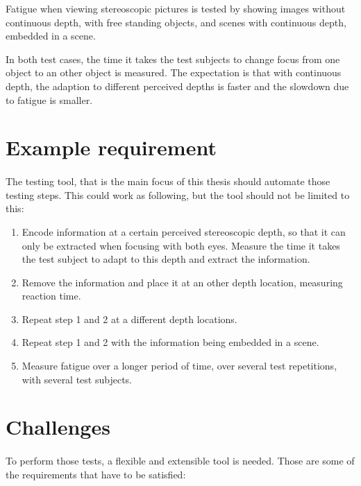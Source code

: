 \documentclass[11pt]{scrartcl}
\begin{document}
\begin{multicols}{2}
Fatigue when viewing stereoscopic pictures is tested by showing images without continuous depth, with free standing objects, and scenes with continuous depth, embedded in a scene.

In both test cases, the time it takes the test subjects to change focus from one object to an other object is measured. The expectation is that with continuous depth, the adaption to different perceived depths is faster and the slowdown due to fatigue is smaller.

\section{Example requirement}
\paragraph{}
The testing tool, that is the main focus of this thesis should automate those testing steps. This could work as following, but the tool should not be limited to this:

\begin{enumerate}
\item Encode information at a certain perceived stereoscopic depth, so that it can only be extracted when focusing with both eyes. Measure the time it takes the test subject to adapt to this depth and extract the information.
\item Remove the information and place it at an other depth location, measuring reaction time.
\item Repeat step 1 and 2 at a different depth locations.
\item Repeat step 1 and 2 with the information being embedded in a scene.
\item Measure fatigue over a longer period of time, over several test repetitions, with several test subjects.
\end{enumerate}

\section{Challenges}
\paragraph{}
To perform those tests, a flexible and extensible tool is needed. Those are some of the requirements that have to be satisfied:


\end{multicols}
\end{document}
